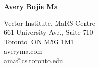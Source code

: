 \documentclass[11pt,letterpaper]{article}
\begin{document}
\raggedright

  {\bfseries\Huge{Avery Bojie Ma}}
  \vspace{10pt}

  {\small
    Vector Institute, MaRS Centre\\
    661 University Ave., Suite 710\\
    Toronto, ON M5G 1M1\\
    \vspace{-1pt}
    \href{http://averyma.com}{averyma.com}\\
    \vspace{-2pt}
    \href{mailto:ama@cs.toronto.edu}{ama@cs.toronto.edu}
    \vspace{-3pt}
  }
  










% 
\end{document}
